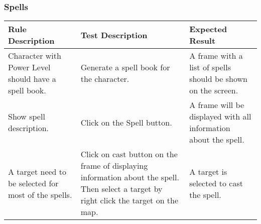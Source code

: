 \subsubsection{Spells}
\begin{center}
\begin{supertabular}{|p{4.5cm}|p{4.5cm}|p{4.5cm}|}
\hline
    \textbf{Rule Description}
    &
    \textbf{Test Description}
    &
    \textbf{Expected Result}
\\\hline
    Character with Power Level should have a spell book.
    &
    Generate a spell book for the character.
    &
    A frame with a list of spells should be shown on the screen.
\\\hline 
    Show spell description.
    &
    Click on the Spell button.
    &
    A frame will be displayed with all information about the spell.
\\\hline   
    A target need to be selected for most of the spells.
    &
    Click on cast button on the frame of displaying information about the spell. 
    Then select a target by right click the target on the map.
    &
    A target is selected to cast the spell.
\\\hline
\end{supertabular}
\end{center}



